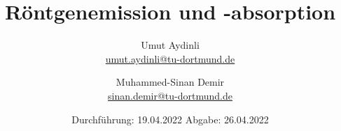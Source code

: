 

\subject{V602}
\title{Röntgenemission und -absorption}
\author{Umut Aydinli \\
 \href{mailto:umut.aydinli@tu-dortmund.de}{umut.aydinli@tu-dortmund.de}
 \and Muhammed-Sinan Demir \\
 \href{mailto:sinan.demir@tu-dortmund.de}{sinan.demir@tu-dortmund.de}
 }
\date{
  Durchführung: 19.04.2022
  \hspace{3em}
  Abgabe: 26.04.2022
}




\maketitle
\tableofcontents
\newpage








\nocite{*}
\printbibliography{}

